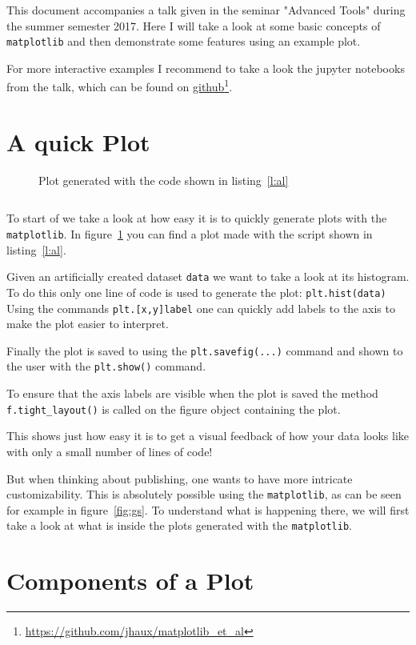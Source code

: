 \documentclass[a4paper, 11pt, onecolumn]{article}
\newcommand{\mpl}{\texttt{matplotlib}\xspace}
\newcommand{\pl}[1]{\mbox{\texttt{#1}\xspace}}
\newcommand{\fref}[2]{\href{#1}{#2}\footnote{\url{#1}}}
\newcommand{\baseref}[3]{\mbox{#1 \ref{#2:#3}\xspace}}
\newcommand{\fig}[1]{\baseref{figure}{fig}{#1}}
\newcommand{\lis}[1]{\baseref{listing}{l}{#1}}
\begin{document}
This document accompanies a talk given in the seminar "Advanced Tools" during
the summer semester 2017. Here I will take a look at some basic concepts of
\mpl and then demonstrate some features using an example plot.

For more interactive examples I recommend to take a look the jupyter notebooks
from the talk, which can be found on
\fref{https://github.com/jhaux/matplotlib\_et\_al}{github}. 

\section{A quick Plot}

\begin{figure}[h!]
\centering

\caption{Plot generated with the code shown in \lis{al}}
\label{fig:al}
\end{figure}

\begin{listing}[h!]
\inputminted{python}{axis_labels.py}
\caption{Code for \fig{al}.}
\label{l:al}
\end{listing}

To start of we take a look at how easy it is to quickly generate plots with
the \mpl.
In \fig{al} you can find a plot made with the script shown
in \lis{al}.

Given an artificially created dataset \pl{data} we want to take a look at its
histogram.
To do this only one line of code is used to generate the plot: 
\pl{plt.hist(data)}
Using the commands \pl{plt.[x,y]label} one can quickly add labels to the
axis to make the plot easier to interpret.

Finally the plot is saved to using the \pl{plt.savefig(...)} command and shown
to the user with the \pl{plt.show()} command.

To ensure that the axis labels are visible when the plot is saved the method
\pl{f.tight\_layout()} is called on the figure object containing the plot.

This shows just how easy it is to get a visual feedback of how your data looks
like with only a small number of lines of code! 

But when thinking about publishing, one wants to have more intricate
customizability. This is absolutely possible using the \mpl, as can be seen for
example in \fig{gs}.  To understand what is happening there, we will
first take a look at what is inside the plots generated with the \mpl.


\section{Components of a Plot}
\end{document}
